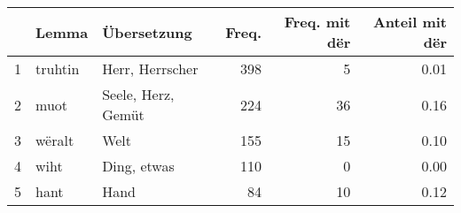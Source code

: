 \begin{tabular}{rllrrr}
  \hline
 & Lemma & Übersetzung & Freq. & Freq. mit dër & Anteil mit dër \\ 
  \hline
1 & truhtin & Herr, Herrscher & 398 &   5 & 0.01 \\ 
  2 & muot & Seele, Herz, Gemüt & 224 &  36 & 0.16 \\ 
  3 & wëralt & Welt & 155 &  15 & 0.10 \\ 
  4 & wiht & Ding, etwas & 110 &   0 & 0.00 \\ 
  5 & hant & Hand &  84 &  10 & 0.12 \\ 
   \hline
\end{tabular}
